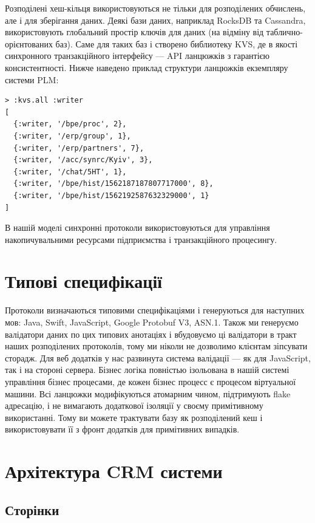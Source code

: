 Розподілені хеш-кільця використовуються не тільки для розподілених обчислень,
але і для зберігання даних.
Деякі бази даних, наприклад RocksDB та Cassandra, використовують глобальний простір
ключів для даних (на відміну від таблично-орієнтованих баз). Саме для таких
баз і створено библиотеку KVS, де в якості синхронного транзакційного
інтерфейсу — API ланцюжків з гарантією консистентності. Нижче
наведено приклад структури ланцюжків екземпляру системи PLM:

   \begin{lstlisting}
> :kvs.all :writer
[
  {:writer, '/bpe/proc', 2},
  {:writer, '/erp/group', 1},
  {:writer, '/erp/partners', 7},
  {:writer, '/acc/synrc/Kyiv', 3},
  {:writer, '/chat/5HT', 1},
  {:writer, '/bpe/hist/1562187187807717000', 8},
  {:writer, '/bpe/hist/1562192587632329000', 1}
]
\end{lstlisting}

В нашій моделі синхронні протоколи використовуються для управління
накопичувальними ресурсами підприємства і транзакційного процесингу.

\section{Типові специфікації}

Протоколи визначаються типовими специфікаціями і генеруються для наступних мов:
Java, Swift, JavaScript, Google Protobuf V3, ASN.1. Також ми генеруємо валідатори даних по цих
типових анотаціях і вбудовуємо ці валідатори в тракт наших розподілених протоколів,
тому ми ніколи не дозволимо клієнтам зіпсувати сторадж. Для веб додатків у нас развинута
система валідації — як для JavaScript, так і на стороні сервера. Бізнес логіка повністью ізольована в нашій
системі управління бізнес процесами, де кожен бізнес процесс
є процесом віртуальної машини. Всі ланцюжки модифікуються атомарним чином,
підтримують flake адресацію, і не вимагають додаткової ізоляції
у своєму примітивному використанні.
Тому ви можете трактувати базу як розподілений кеш
і використовувати її з фронт додатків для примітивних випадків.

\newpage
\section{Архітектура CRM системи}

\subsection{Сторінки}

